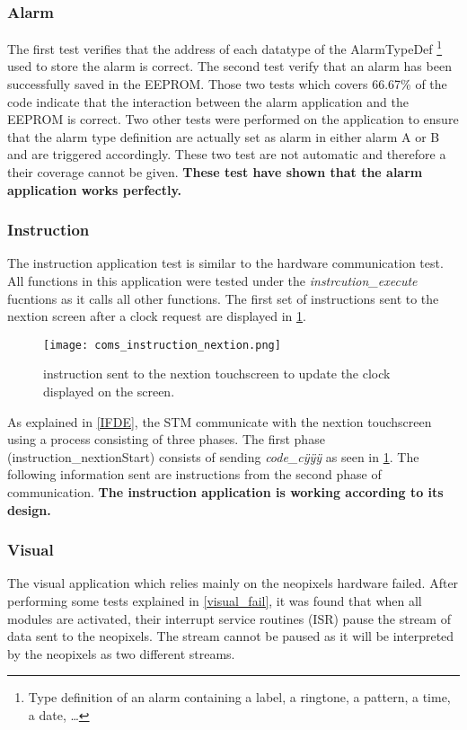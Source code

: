 \subsubsection{Alarm}
The first test verifies that the address of each datatype of the AlarmTypeDef \footnote{Type definition of an alarm containing a label, a ringtone, a pattern, a time, a date, \ldots} used to store the alarm is correct. The second test verify that an alarm has been successfully saved in the EEPROM. Those two tests which covers 66.67\% of the code indicate that the interaction between the alarm application and the EEPROM is correct. Two other tests were performed on the application to ensure that the alarm type definition are actually set as alarm in either alarm A or B and are triggered accordingly. These two test are not automatic and therefore a their coverage cannot be given. \textbf{These test have shown that the alarm application works perfectly.}

\subsubsection{Instruction}
The instruction application test is similar to the hardware communication test. All functions in this application were tested under the \textit{instrcution\_execute} fucntions as it calls all other functions. The first set of instructions sent to the nextion screen after a clock request are displayed in \cref{fig:coms_instruction_nextion}.
\begin{figure}[ht]
	\centering
	\texttt{[image: coms\_instruction\_nextion.png]}
	\caption{instruction sent to the nextion touchscreen to update the clock displayed on the screen.}
	\label{fig:coms_instruction_nextion}
\end{figure}
As explained in \ref{IFDE}, the STM communicate with the nextion touchscreen using a process consisting of three phases. The first phase (instruction\_nextionStart) consists of sending \textit{code\_c\"{y}\"{y}\"{y}} as seen in \cref{fig:coms_instruction_nextion}. The following information sent are instructions from the second phase of communication. \textbf{The instruction application is working according to its design.}

\subsubsection{Visual}
The visual application which relies mainly on the neopixels hardware failed. After performing some tests explained in \ref{visual_fail}, it was found that when all modules are activated, their interrupt service routines (ISR) pause the stream of data sent to the neopixels. The stream cannot be paused as it will be interpreted by the neopixels as two different streams. 

